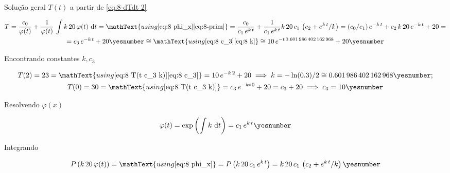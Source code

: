 \documentclass["AM3C-Slides_annotations.tex"]{subfiles}
\begin{document}
\begin{exampleBox}
  Solução geral \(T(t)\) a partir de \eqref{eq:8-dTdt 2}
  \begin{tcolorbox}
    \begin{gather*}
      T
      = \frac{c_0}{\varphi(t)}
      + \frac{1  }{\varphi(t)}
      \,\int{k\,20\,\varphi(t)\,\odif{t}}
      = \mathText{using 
        \eqref{eq:8 phi_x}
        \eqref{eq:8-prim}
      }
      = \frac{c_0}{c_1\,e^{k\,t}}
      + \frac{1  }{c_1\,e^{k\,t}}
      k\,20\,c_1\,\left(
        c_2+e^{k\,t}/k
      \right)
      = (c_0/c_1)\,e^{-k\,t}
      + c_2\,k\,20\,e^{-k\,t}
      + 20
      = \\
      = c_3\,e^{-k\,t}
      + 20
      \yesnumber\label{eq:8 T(t c_3 k)}
      \cong \mathText{using \eqref{eq:8 c_3}\eqref{eq:8 k}}
      \cong 10\,e^{-t\,\num{0.601986402162968}}
      + 20
      \yesnumber\label{eq:8 t(t)}
    \end{gather*}
  \end{tcolorbox}

  Encontrando constantes \(k,c_3\)
  \begin{tcolorbox}
    \begin{gather*}
      T(2) = 23
      = \mathText{using \eqref{eq:8 T(t c_3 k)}\eqref{eq:8 c_3}}
      = 10\,e^{-k\,2}
      + 20
      \implies
      k 
      = -\ln(0.3)/2
      \cong \num{0.601986402162968}
      \yesnumber\label{eq:8 k}
      ;\\
      T(0) = 30
      = \mathText{using \eqref{eq:8 T(t c_3 k)}}
      = c_3\,e^{-k*0}
      + 20
      = c_3
      + 20
      \implies
      c_3 = 10
      \yesnumber\label{eq:8 c_3}
    \end{gather*}
  \end{tcolorbox}

  Resolvendo \(\varphi(x)\)
  \begin{tcolorbox}
    \begin{gather*}
      \varphi(t) 
      = \exp{\left(
          \int{k\,\odif{t}}
      \right)}
      = c_1\,e^{ k\,t }
      \yesnumber\label{eq:8 phi_x}
    \end{gather*}
  \end{tcolorbox}

  Integrando
  \begin{tcolorbox}
    \begin{gather*}
      P\left(
        k\,20\,\varphi(t)
      \right)
      = \mathText{using \eqref{eq:8 phi_x}}
      = P\left(
        k\,20\,c_1\,e^{k\,t}
      \right)
      = k\,20\,c_1\,\left(
        c_2+e^{k\,t}/k
      \right)
      \yesnumber\label{eq:8-prim}
    \end{gather*}
  \end{tcolorbox}

\end{exampleBox}
\end{document}
